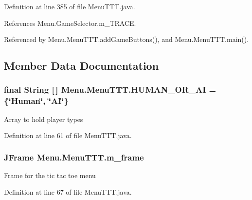 Definition at line 385 of file Menu\+T\+T\+T.\+java.



References Menu.\+Game\+Selector.\+m\+\_\+\+T\+R\+A\+C\+E.



Referenced by Menu.\+Menu\+T\+T\+T.\+add\+Game\+Buttons(), and Menu.\+Menu\+T\+T\+T.\+main().



\subsection{Member Data Documentation}
\hypertarget{class_menu_1_1_menu_t_t_t_ae21a60dde8c0681fe99ca3a163713775}{}
\subsubsection[{H\+U\+M\+A\+N\+\_\+\+O\+R\+\_\+\+A\+I}]{\setlength{\rightskip}{0pt plus 5cm}final String \mbox{[}$\,$\mbox{]} Menu.\+Menu\+T\+T\+T.\+H\+U\+M\+A\+N\+\_\+\+O\+R\+\_\+\+A\+I = \{\char`\"{}Human\char`\"{}, \char`\"{}A\+I\char`\"{}\}\hspace{0.3cm}{\ttfamily [private]}}\label{class_menu_1_1_menu_t_t_t_ae21a60dde8c0681fe99ca3a163713775}
Array to hold player types 

Definition at line 61 of file Menu\+T\+T\+T.\+java.

\hypertarget{class_menu_1_1_menu_t_t_t_a22f4227f781ebf5a22bb0c68c588537d}{}
\subsubsection[{m\+\_\+frame}]{\setlength{\rightskip}{0pt plus 5cm}J\+Frame Menu.\+Menu\+T\+T\+T.\+m\+\_\+frame\hspace{0.3cm}{\ttfamily [private]}}\label{class_menu_1_1_menu_t_t_t_a22f4227f781ebf5a22bb0c68c588537d}
Frame for the tic tac toe menu 

Definition at line 67 of file Menu\+T\+T\+T.\+java.

\hypertarget{class_menu_1_1_menu_t_t_t_a59b7acc44f8e856bd54c46a8c81b1990}{}
